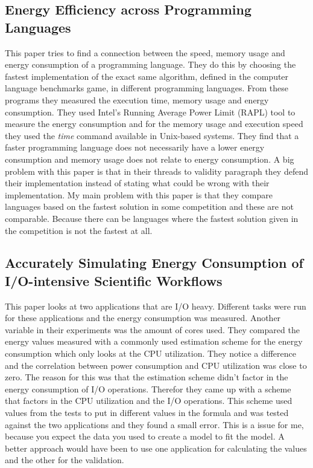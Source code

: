 \subsection{Energy Efficiency across Programming Languages
 \cite{pereira2017energy}}
 This paper tries to find a connection between the speed, memory usage and energy consumption of a programming language. They do this by choosing the fastest implementation of the exact same algorithm, defined in the computer language benchmarks game, in different programming languages. From these programs they measured the execution time, memory usage and energy consumption. They used Intel’s Running Average Power Limit (RAPL) tool to measure the energy consumption and for the memory usage and execution speed they used the \textit{time} command available in Unix-based systems. They find that a faster programming language does not necessarily have a lower energy consumption and memory usage does not relate to energy consumption. A big problem with this paper is that in their threads to validity paragraph they defend their implementation instead of stating what could be wrong with their implementation. My main problem with this paper is that they compare languages based on the fastest solution in some competition and these are not comparable. Because there can be languages where the fastest solution given in the competition is not the fastest at all.
 
 \subsection{Accurately Simulating Energy Consumption of I/O-intensive Scientific Workflows \cite{ferreiradasilva-iccs-2019}}
 This paper looks at two applications that are I/O heavy. Different tasks were run for these applications and the energy consumption was measured. Another variable in their experiments was the amount of cores used. They compared the energy values measured with a commonly used estimation scheme for the energy consumption which only looks at the CPU utilization. They notice a difference and the correlation between power consumption and CPU utilization was close to zero. The reason for this was that the estimation scheme didn't factor in the energy consumption of I/O operations. Therefor they came up with a scheme that factors in the CPU utilization and the I/O operations. This scheme used values from the tests to put in different values in the formula and was tested against the two applications and they found a small error. This is a issue for me, because you expect the data you used to create a model to fit the model. A better approach would have been to use one application for calculating the values and the other for the validation.
 
